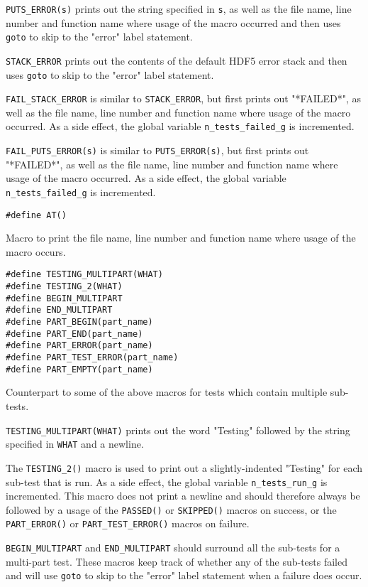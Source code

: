 \documentclass[../HDF5_RFC.tex]{subfiles}
\begin{document}
\texttt{PUTS\_ERROR(s)} prints out the string specified in \texttt{s}, as well as the file name, line
number and function name where usage of the macro occurred and then uses \texttt{goto} to skip to the
"error" label statement.

\texttt{STACK\_ERROR} prints out the contents of the default HDF5 error stack and then uses \texttt{goto}
to skip to the "error" label statement.

\texttt{FAIL\_STACK\_ERROR} is similar to \texttt{STACK\_ERROR}, but first prints out "*FAILED*", as well
as the file name, line number and function name where usage of the macro occurred. As a side effect, the global variable \texttt{n\_tests\_failed\_g} is incremented.

\texttt{FAIL\_PUTS\_ERROR(s)} is similar to \texttt{PUTS\_ERROR(s)}, but first prints out "*FAILED*", as
well as the file name, line number and function name where usage of the macro occurred. As a side effect,
the global variable \texttt{n\_tests\_failed\_g} is incremented.

\begin{verbatim}
#define AT()
\end{verbatim}

Macro to print the file name, line number and function name where usage of the macro occurs.

\begin{verbatim}
#define TESTING_MULTIPART(WHAT)
#define TESTING_2(WHAT)
#define BEGIN_MULTIPART
#define END_MULTIPART
#define PART_BEGIN(part_name)
#define PART_END(part_name)
#define PART_ERROR(part_name)
#define PART_TEST_ERROR(part_name)
#define PART_EMPTY(part_name)
\end{verbatim}

Counterpart to some of the above macros for tests which contain multiple sub-tests.

\texttt{TESTING\_MULTIPART(WHAT)} prints out the word "Testing" followed by the string specified in \texttt{WHAT} and a newline.

The \texttt{TESTING\_2()} macro is used to print out a slightly-indented "Testing" for each sub-test
that is run. As a side effect, the global variable \texttt{n\_tests\_run\_g} is incremented. This macro
does not print a newline and should therefore always be followed by a usage of the \texttt{PASSED()} or
\texttt{SKIPPED()} macros on success, or the \texttt{PART\_ERROR()} or \texttt{PART\_TEST\_ERROR()}
macros on failure.

\texttt{BEGIN\_MULTIPART} and \texttt{END\_MULTIPART} should surround all the sub-tests for a multi-part
test. These macros keep track of whether any of the sub-tests failed and will use \texttt{goto} to skip
to the "error" label statement when a failure does occur.
\end{document}
